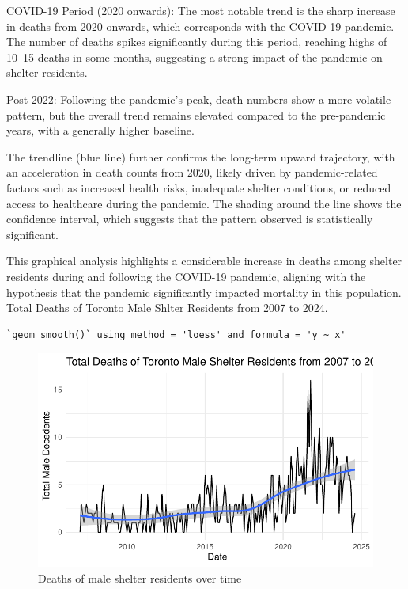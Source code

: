 \documentclass[
  letterpaper,
  DIV=11,
  numbers=noendperiod]{scrartcl}
\begin{document}
COVID-19 Period (2020 onwards): The most notable trend is the sharp
increase in deaths from 2020 onwards, which corresponds with the
COVID-19 pandemic. The number of deaths spikes significantly during this
period, reaching highs of 10--15 deaths in some months, suggesting a
strong impact of the pandemic on shelter residents.

Post-2022: Following the pandemic's peak, death numbers show a more
volatile pattern, but the overall trend remains elevated compared to the
pre-pandemic years, with a generally higher baseline.

The trendline (blue line) further confirms the long-term upward
trajectory, with an acceleration in death counts from 2020, likely
driven by pandemic-related factors such as increased health risks,
inadequate shelter conditions, or reduced access to healthcare during
the pandemic. The shading around the line shows the confidence interval,
which suggests that the pattern observed is statistically significant.

This graphical analysis highlights a considerable increase in deaths
among shelter residents during and following the COVID-19 pandemic,
aligning with the hypothesis that the pandemic significantly impacted
mortality in this population. Total Deaths of Toronto Male Shlter
Residents from 2007 to 2024.

\begin{verbatim}
`geom_smooth()` using method = 'loess' and formula = 'y ~ x'
\end{verbatim}

\begin{figure}

{\centering \includegraphics{paper_files/figure-pdf/fig-male_decedents-1.pdf}

}

\caption{\label{fig-male_decedents}Deaths of male shelter residents over
time}

\end{figure}
\end{document}
